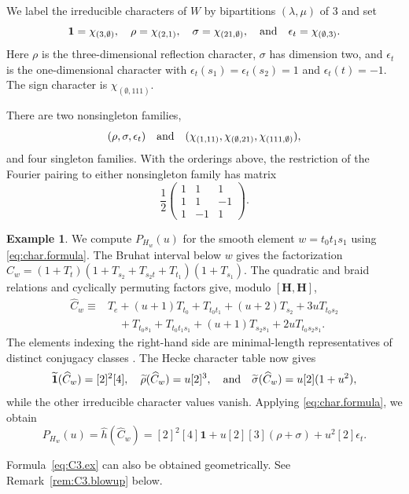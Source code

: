 \documentclass[11pt]{amsart}
\numberwithin{equation}{section}
\theoremstyle{definition}
\newtheorem{example}[theorem]{Example}
\newcommand\hecke{\mathbf{H}}  %
\def\and{\quad{\rm and}\quad}
\def\beq{\begin{equation}}
\def\eeq{\end{equation}}
\begin{document}
We label the irreducible characters of $W$ by bipartitions $(\lambda,\mu)$ of $3$ and set
\[
\mathbf1=\chi_{(3,\emptyset)},\quad
\rho=\chi_{(2,1)},\quad \sigma=\chi_{(21,\emptyset)},\and
\epsilon_t=\chi_{(\emptyset,3)}.
\]
Here $\rho$ is the three-dimensional reflection character, $\sigma$ has dimension two, and $\epsilon_t$ is the one-dimensional character with $\epsilon_t(s_1)=\epsilon_t(s_2)=1$ and $\epsilon_t(t)=-1$.
The sign character is $\chi_{(\emptyset,111)}$.

There are two nonsingleton families,
\[
(\rho,\sigma,\epsilon_t) \and
(\chi_{(1,11)},\chi_{(\emptyset,21)},\chi_{(111,\emptyset)}),
\]
and four singleton families. With the orderings above, the restriction
of the Fourier pairing to either nonsingleton family has matrix
\cite[Section~4.5]{Lus84}
\[
\frac12
\begin{pmatrix}1&1&1\\1&1&-1\\1&-1&1\end{pmatrix}.
\]
\begin{example}\label{ex:C3.character}
We compute $P_{H_w}(u)$ for the smooth element $w=t_0t_1s_1$ using \eqref{eq:char.formula}.
The Bruhat interval below $w$ gives the factorization $\widehat C_w =(1+T_t)(1+T_{s_2}+T_{s_2t}+T_{t_1})(1+T_{s_1})$.
The quadratic and braid relations and cyclically permuting factors give, modulo $[\hecke,\hecke]$,
\[
\begin{aligned}
\widehat C_w\equiv{}&
T_e+(u+1)T_{t_0}+T_{t_0t_1}+(u+2)T_{s_2}
 +3uT_{t_0s_2}\\
&\quad+T_{t_0s_1}+T_{t_0t_1s_1}
 +(u+1)T_{s_2s_1}+2uT_{t_0s_2s_1}.
\end{aligned}
\]
The elements indexing the right-hand side are minimal-length representatives of distinct conjugacy classes
\cite[Example~3.4.8]{GP}.
The Hecke character table \cite[Table~10.3]{GP} now gives
\[
\widetilde{\mathbf1}(\widehat C_w)=[2]^2[4],\quad
\widetilde\rho(\widehat C_w)=u[2]^3,\and 
\widetilde\sigma(\widehat C_w)=u[2](1+u^2),
\]
while the other irreducible character values vanish.
Applying \eqref{eq:char.formula}, we obtain
\beq\label{eq:C3.ex}
P_{H_w}(u)=\widehat h(\widehat C_w)
=[2]^2[4]\mathbf1+u[2][3](\rho+\sigma)+u^2[2]\epsilon_t.
\eeq

Formula~\eqref{eq:C3.ex} can also be obtained geometrically.
See Remark~\ref{rem:C3.blowup} below. %
\end{example}
\end{document}
